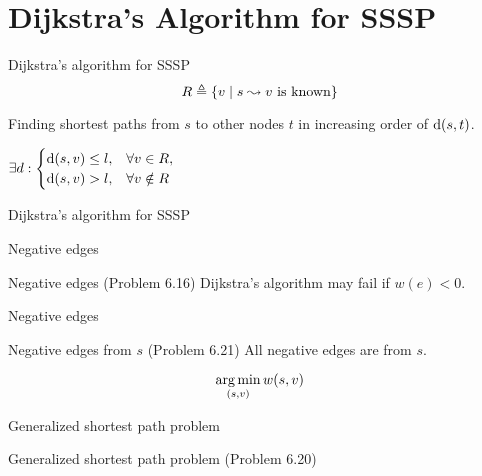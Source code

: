 \section{Dijkstra's Algorithm for SSSP}

\begin{frame}{Dijkstra's algorithm for SSSP}
  \[
	R \triangleq \{v \mid s \leadsto v \text{ is known}\}
  \]

  \vspace{0.50cm}
  \begin{center}
	Finding shortest paths from $s$ to other nodes $t$ in increasing order of $\text{d}(s,t)$.
  \end{center}

  \begin{theorem}[Invariant]
	$\begin{displaystyle}
	  \exists d: \begin{cases}
		\dist(s,v) \le l, 	& \forall v \in R, \\
		\dist(s,v) > l, 	& \forall v \notin R
	  \end{cases}
	\end{displaystyle}$
  \end{theorem}
\end{frame}
\begin{frame}{Dijkstra's algorithm for SSSP}
\end{frame}
\begin{frame}{Negative edges}
  \begin{exampleblock}{Negative edges (Problem 6.16)}
	Dijkstra's algorithm may fail if $w(e) < 0$.
  \end{exampleblock}

\end{frame}
\begin{frame}{Negative edges}
  \begin{exampleblock}{Negative edges from $s$ (Problem 6.21)}
	All negative edges are from $s$.
  \end{exampleblock}

  \vspace{0.50cm}
  \[
	\operatorname*{arg\,min}_{(s,v)} w(s,v)
  \]
\end{frame}
\begin{frame}{Generalized shortest path problem}
  \begin{exampleblock}{Generalized shortest path problem (Problem 6.20)}
  \end{exampleblock}
\end{frame}
